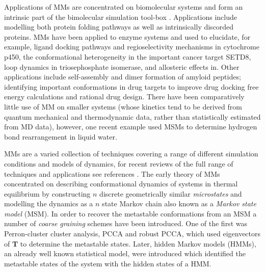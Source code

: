 Applications of MMs are concentrated on biomolecular systems and form an intrinsic part of the bimolecular simulation tool-box \cite{hugginsBiomolecularSimulationsDynamics2019}. Applications include modelling both protein folding pathways \cite{singhalUsingPathSampling2004,swopeDescribingProteinFolding2004} as well as intrinsically discorded proteins\cite{schorAnalyticalMethodsStructural2016a}. 
MMs have been applied to enzyme systems and used to elucidate, for example, ligand docking pathways\cite{ahalawatMappingSubstrateRecognition2018a} and regioselectivity mechanisms in cytochrome p450\cite{dodaniDiscoveryRegioselectivitySwitch2016a}, the conformational heterogeneity in the important cancer target SETD8\cite{chenDynamicConformationalLandscape2019a}, loop dynamics in triosephosphate isomerase\cite{LoopMotionTriosephosphate}, and allosteric effects in\cite{wapeesittipanAllostericEffectsCyclophilin2019}. Other applications include self-assembly\cite{senguptaAutomatedMarkovState2019} and dimer formation\cite{leahyCoarseMasterEquations2016} of amyloid peptides; identifying important conformations in drug targets to improve drug docking free energy calculations\cite{amaroEnsembleDockingDrug2018} and rational drug design\cite{gervasioBiomolecularSimulationsStructureBased2019}. There have been comparatively little use of MM on smaller systems (whose kinetics tend to be derived from quantum mechanical and thermodynamic data\cite{glowackiMESMEROpenSourceMaster2012, pillingMasterEquationModels2003}, rather than statistically estimated from MD data), however, one recent example used MSMs to determine hydrogen bond rearrangement in liquid water\cite{schulzCollectiveHydrogenbondRearrangement2018}. 

MMs are a varied collection of techniques covering a range of different simulation conditions and models of dynamics, for recent reviews of the full range of techniques and applications see references \cite{husicMarkovStateModels2018, noeMarkovModelsMolecular2019b}. The early theory of MMs concentrated on describing conformational dynamics of systems in thermal equilibrium by constructing $n$ discrete geometrically similar \emph{microstates} and modelling the dynamics as a $n$ state Markov chain \cite{singhalUsingPathSampling2004, swopeDescribingProteinFolding2004, prinzMarkovModelsMolecular2011} also known as a \emph{Markov state model} (MSM). In order to recover the metastable conformations from an MSM a number of \emph{coarse graining} schemes have been introduced. One of the first was Perron-cluster cluster analysis, PCCA\cite{deuflhardIdentificationAlmostInvariant2000a} and robust PCCA\cite{deuflhardRobustPerronCluster2005b}, which used eigenvectors of $\mathbf{T}$ to determine the metastable states. Later, hidden Markov models (HMMs), an already well known statistical model\cite{rabinerTutorialHiddenMarkov1989}, were introduced  which  identified the metastable states of the system with the hidden states of a HMM\cite{noeMarkovModelsMolecular2019b}. 

